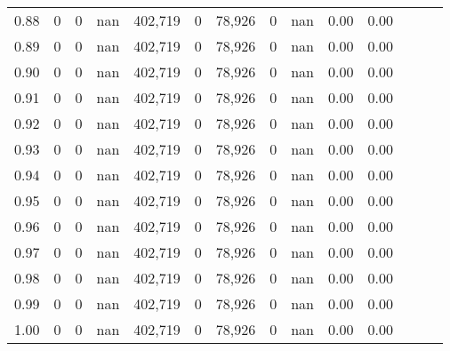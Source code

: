 \begin{tabular}{rrrrrrrrrrrrrr}
0.88 &       0 &       0 &   nan &  402,719 &        0 &  78,926 &       0 &   nan &  0.00 &      0.00 \\
0.89 &       0 &       0 &   nan &  402,719 &        0 &  78,926 &       0 &   nan &  0.00 &      0.00 \\
0.90 &       0 &       0 &   nan &  402,719 &        0 &  78,926 &       0 &   nan &  0.00 &      0.00 \\
0.91 &       0 &       0 &   nan &  402,719 &        0 &  78,926 &       0 &   nan &  0.00 &      0.00 \\
0.92 &       0 &       0 &   nan &  402,719 &        0 &  78,926 &       0 &   nan &  0.00 &      0.00 \\
0.93 &       0 &       0 &   nan &  402,719 &        0 &  78,926 &       0 &   nan &  0.00 &      0.00 \\
0.94 &       0 &       0 &   nan &  402,719 &        0 &  78,926 &       0 &   nan &  0.00 &      0.00 \\
0.95 &       0 &       0 &   nan &  402,719 &        0 &  78,926 &       0 &   nan &  0.00 &      0.00 \\
0.96 &       0 &       0 &   nan &  402,719 &        0 &  78,926 &       0 &   nan &  0.00 &      0.00 \\
0.97 &       0 &       0 &   nan &  402,719 &        0 &  78,926 &       0 &   nan &  0.00 &      0.00 \\
0.98 &       0 &       0 &   nan &  402,719 &        0 &  78,926 &       0 &   nan &  0.00 &      0.00 \\
0.99 &       0 &       0 &   nan &  402,719 &        0 &  78,926 &       0 &   nan &  0.00 &      0.00 \\
1.00 &       0 &       0 &   nan &  402,719 &        0 &  78,926 &       0 &   nan &  0.00 &      0.00 \\
\bottomrule
\end{tabular}
